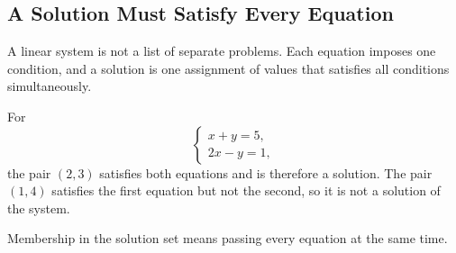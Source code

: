 \subsection{A Solution Must Satisfy Every Equation}

\begin{corebox}
A linear system is not a list of separate problems. Each equation imposes one condition, and a solution is one assignment of values that satisfies all conditions simultaneously.
\end{corebox}

\begin{examplebox}
For
\[
\begin{cases}
x+y=5,\\
2x-y=1,
\end{cases}
\]
the pair $(2,3)$ satisfies both equations and is therefore a solution. The pair $(1,4)$ satisfies the first equation but not the second, so it is not a solution of the system.
\end{examplebox}

\begin{interpretationbox}
Membership in the solution set means passing every equation at the same time.
\end{interpretationbox}
